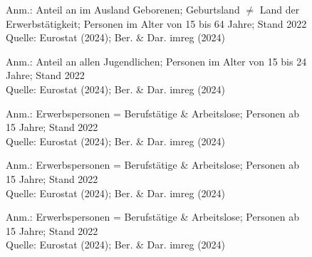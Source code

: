 \begin{figure}[p]
	{\centering {}}
	\label{map:erwerbausland}
	\begin{spacing}{1} \scriptsize
		Anm.: Anteil an im Ausland Geborenen; Geburtsland $\neq$ Land der Erwerbstätigkeit; Personen im Alter von 15 bis 64 Jahre; Stand 2022\\
		Quelle: Eurostat (2024); Ber. \& Dar. imreg (2024) \end{spacing}
\end{figure}


\begin{figure}[p]
	{\centering {}}
	\label{map:erwerbjugend}
	\begin{spacing}{1} \scriptsize
		Anm.: Anteil an allen Jugendlichen; Personen im Alter von 15 bis 24 Jahre; Stand 2022\\
		Quelle: Eurostat (2024); Ber. \& Dar. imreg (2024) \end{spacing}
\end{figure}


\begin{figure}[p]
	{\centering {}}
	\label{map:erwerbspers}
	\begin{spacing}{1} \scriptsize
		Anm.: Erwerbspersonen = Berufstätige \& Arbeitslose; Personen ab 15 Jahre; Stand 2022\\
		Quelle: Eurostat (2024); Ber. \& Dar. imreg (2024) \end{spacing}
\end{figure}


\begin{figure}[p]
	{\centering {}}
	\label{map:erwerbspersfrauen}
	\begin{spacing}{1} \scriptsize
		Anm.: Erwerbspersonen = Berufstätige \& Arbeitslose; Personen ab 15 Jahre; Stand 2022\\
		Quelle: Eurostat (2024); Ber. \& Dar. imreg (2024) \end{spacing}
\end{figure}


\begin{figure}[p]
	{\centering {}}
	\label{map:erwerbspersmaenner}
	\begin{spacing}{1} \scriptsize
		Anm.: Erwerbspersonen = Berufstätige \& Arbeitslose; Personen ab 15 Jahre; Stand 2022\\
		Quelle: Eurostat (2024); Ber. \& Dar. imreg (2024) \end{spacing}
\end{figure}



